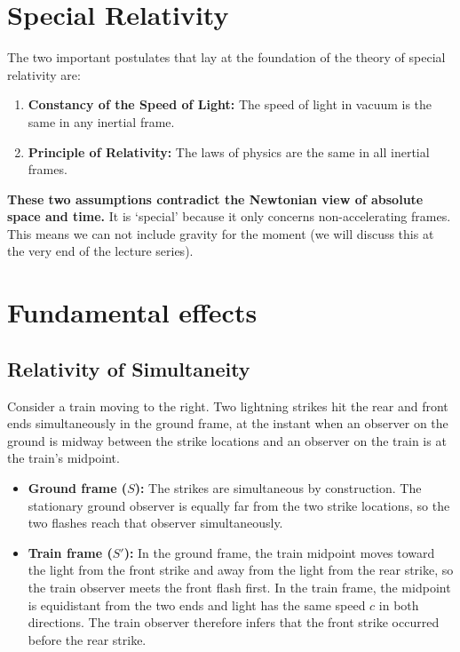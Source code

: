 \documentclass[12pt]{article}
\begin{document}
\section{Special Relativity}\label{sec:SR}
The two important postulates that lay at the foundation of the theory of special relativity are: 
\begin{tcolorbox}[colback=blue!5!white]
\begin{enumerate}
    \item \textbf{Constancy of the Speed of Light:} The speed of light in vacuum is the same in any inertial frame.
    \item \textbf{Principle of Relativity:} The laws of physics are the same in all inertial frames.   
\end{enumerate}
\end{tcolorbox}

\noindent  
\textbf{These two assumptions contradict the Newtonian view of absolute space and time.} It is `special' because it only concerns non-accelerating frames. This means we can not include gravity for the moment (we will discuss this at the very end of the lecture series).  


\section{Fundamental effects}
\subsection{Relativity of Simultaneity}\label{sec:Rsim}
Consider a train moving to the right. Two lightning strikes hit the rear and front ends simultaneously in the ground frame, at the instant when an observer on the ground is midway between the strike locations and an observer on the train is at the train's midpoint.
\begin{itemize}
    \item \textbf{Ground frame ($S$):} The strikes are simultaneous by construction. The stationary ground observer is equally far from the two strike locations, so the two flashes reach that observer simultaneously.
    \item \textbf{Train frame ($S'$):} In the ground frame, the train midpoint moves toward the light from the front strike and away from the light from the rear strike, so the train observer meets the front flash first. In the train frame, the midpoint is equidistant from the two ends and light has the same speed $c$ in both directions. The train observer therefore infers that the front strike occurred before the rear strike.
\end{itemize}
\end{document}
